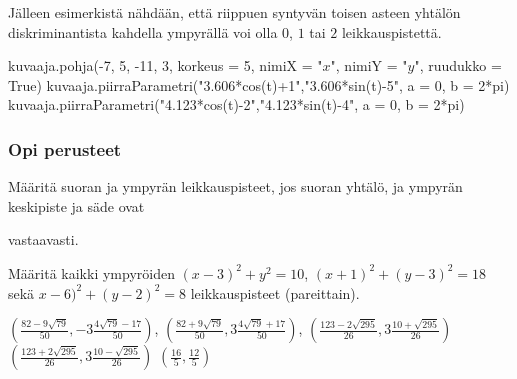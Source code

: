Jälleen esimerkistä nähdään, että riippuen syntyvän toisen asteen yhtälön diskriminantista kahdella ympyrällä voi olla $0$, $1$ tai $2$ leikkauspistettä.


\begin{kuva}
    kuvaaja.pohja(-7, 5, -11, 3, korkeus = 5, nimiX = "$x$", nimiY = "$y$", ruudukko = True)
    kuvaaja.piirraParametri("3.606*cos(t)+1","3.606*sin(t)-5", a = 0, b = 2*pi)
    kuvaaja.piirraParametri("4.123*cos(t)-2","4.123*sin(t)-4", a = 0, b = 2*pi)
	
\end{kuva}

\begin{tehtavasivu}

\subsubsection*{Opi perusteet}

\begin{tehtava}
Määritä suoran ja ympyrän leikkauspisteet, jos suoran yhtälö, ja ympyrän keskipiste ja säde ovat
\begin{alakohdat}
\end{alakohdat}
vastaavasti.
\begin{vastaus}
\begin{alakohdat}
\end{alakohdat}
\end{vastaus}
\end{tehtava}

\begin{tehtava}
Määritä kaikki ympyröiden $ (x-3)^2+y^2= 10$, $(x+1)^2+(y-3)^2 = 18$ sekä $x-6)^2+(y-2)^2 = 8$ leikkauspisteet (pareittain).
\begin{vastaus}
$(\frac{82-9\sqrt{79}}{50},-3\frac{4\sqrt{79}-17}{50})$, $(\frac{82+9\sqrt{79}}{50},3\frac{4\sqrt{79}+17}{50})$,
$(\frac{123-2\sqrt{295}}{26}, 3\frac{10+\sqrt{295}}{26})$
$(\frac{123+2\sqrt{295}}{26}, 3\frac{10-\sqrt{295}}{26})$
$(\frac{16}{5}, \frac{12}{5})$
\end{vastaus}
\end{tehtava}


\end{tehtavasivu}
